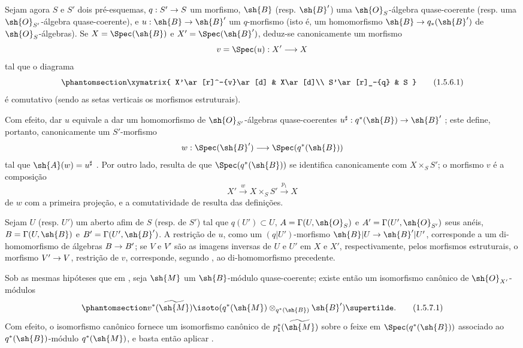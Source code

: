 \documentclass[oneside,10pt]{amsart}
\makeatletter
\newcommand{\ega@arrow}[2]{\mathchoice{#1}{#2}{#2}{#2}}
\renewcommand{\to}{\ega@arrow{\longrightarrow}{\rightarrow}}
\newcommand{\oldpage}[2][]{\marginnote{\normalfont\footnotesize\textbf{#1}~|~#2}\ignorespaces}
\let\EGAOriginalLabel\label
\renewcommand{\label}[1]{\phantomsection\EGAOriginalLabel{#1}}
\makeatother
\begin{document}
\begin{env}[1.5.6]
\label{II.1.5.6}
Sejam agora $S$ e $S'$ dois pré-esquemas, $q:S'\to S$ um morfismo, $\sh{B}$ (resp. $\sh{B}'$) uma $\sh{O}_S$-álgebra quase-coerente (resp. uma $\sh{O}_{S'}$-álgebra quase-coerente), e $u:\sh{B}\to\sh{B}'$ um $q$-morfismo (isto é, um homomorfismo $\sh{B}\to q_*(\sh{B}')$ de $\sh{O}_S$-álgebras).
Se $X=\Spec(\sh{B})$ e $X'=\Spec(\sh{B}')$, deduz-se canonicamente um morfismo
\[
  v=\Spec(u):X'\to X
\]
tal que o diagrama
\[
\label{II.1.5.6.1}
  \xymatrix{
    X'\ar[r]^-{v}\ar[d] & X\ar[d]\\
    S'\ar[r]_-{q} & S
  }
  \tag{1.5.6.1}
\]
é comutativo (sendo as setas verticais os morfismos estruturais).

Com efeito, dar $u$ equivale a dar um homomorfismo de $\sh{O}_{S'}$-álgebras quase-coerentes $u^\sharp:q^*(\sh{B})\to\sh{B}'$ ; este define, portanto, canonicamente um $S'$-morfismo
\[
  w:\Spec(\sh{B}')\to\Spec(q^*(\sh{B}))
\]
tal que $\sh{A}(w)=u^\sharp$ .
Por outro lado, resulta de  que $\Spec(q^*(\sh{B}))$ se identifica canonicamente com $X\times_S S'$; o morfismo $v$ é a composição
\[
  X'\xrightarrow{w}X\times_S S'\xrightarrow{p_1}X
\]
de $w$ com a primeira projeção, e a comutatividade de  resulta das definições.

Sejam $U$ (resp. $U'$) um aberto afim de $S$ (resp. de $S'$) tal que $q(U')\subset U$, $A=\Gamma(U,\sh{O}_S)$ e $A'=\Gamma(U',\sh{O}_{S'})$ seus anéis, $B=\Gamma(U,\sh{B})$ e $B'=\Gamma(U',\sh{B}')$.
A restrição de $u$, como um $(q|U')$-morfismo $\sh{B}|U\to\sh{B}'|U'$, corresponde a um di-homomorfismo de álgebras $B\to B'$; se $V$ e $V'$ são as imagens inversas de $U$ e $U'$ em $X$ e $X'$, respectivamente, pelos morfismos estruturais, o morfismo $V'\to V$, restrição de $v$, corresponde, segundo , ao di-homomorfismo precedente.
\end{env}

\begin{env}[1.5.7]
\label{II.1.5.7}
Sob as mesmas hipóteses que em , seja $\sh{M}$ um $\sh{B}$-módulo quase-coerente; existe então um isomorfismo canônico de $\sh{O}_{X'}$-módulos
\[
\label{II.1.5.7.1}
  v^*(\widetilde{\sh{M}})
  \isoto
  (q^*(\sh{M})\otimes_{q^*(\sh{B})}\sh{B}')\supertilde.
  \tag{1.5.7.1}
\]
\oldpage[II]{14}
Com efeito, o isomorfismo canônico  fornece um isomorfismo canônico de $p_1^*(\widetilde{\sh{M}})$ sobre o feixe em $\Spec(q^*(\sh{B}))$ associado ao $q^*(\sh{B})$-módulo $q^*(\sh{M})$, e basta então aplicar .
\end{env}
\end{document}
